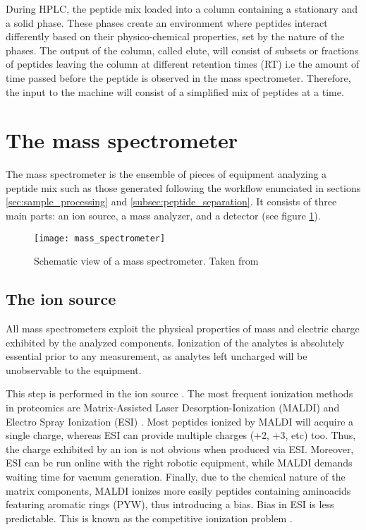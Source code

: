 During \ac{HPLC}, the peptide mix loaded into a column containing a stationary and a solid phase. These phases create an environment where peptides interact differently based on their physico-chemical properties, set by the nature of the phases. The output of the column, called elute, will consist of subsets or fractions of peptides leaving the column at different retention times (\ac{RT}) i.e the amount of time passed before the peptide is observed in the mass spectrometer. Therefore, the input to the machine will consist of a simplified mix of peptides at a time.

\section{The mass spectrometer}
\label{sec:the_mass_spectrometer}

The mass spectrometer is the ensemble of pieces of equipment analyzing a peptide mix such as those generated following the workflow enunciated in sections \ref{sec:sample_processing} and \ref{subsec:peptide_separation}. It consists of three main parts: an ion source, a mass analyzer, and a detector (see figure \ref{fig:mass_spectrometer}).

\begin{figure}[!h]
\texttt{[image: mass\_spectrometer]}
\caption[]{Schematic view of a mass spectrometer. Taken from \footnotemark{}}
\label{fig:mass_spectrometer}
\end{figure}


\subsection{The ion source}
\label{subsec:the_ion_source}

All mass spectrometers exploit the physical properties of mass and electric charge exhibited by the analyzed components. Ionization of the analytes is absolutely essential prior to any measurement, as analytes left uncharged will be unobservable to the equipment.


This step is performed in the ion source \cite{Barsnes2008}. The most frequent ionization methods in proteomics are Matrix-Assisted Laser Desorption-Ionization (\ac{MALDI}) and Electro Spray Ionization (\ac{ESI}) \cite{Mirzaei2016}. Most peptides ionized by MALDI will acquire a single charge, whereas ESI can provide multiple charges (+2, +3, etc) too. Thus, the charge exhibited by an ion is not obvious when produced via ESI. Moreover, ESI can be run online with the right robotic equipment, while MALDI demands waiting time for vacuum generation. Finally, due to the chemical nature of the matrix components, MALDI ionizes more easily peptides containing aminoacids featuring aromatic rings (PYW), thus introducing a bias. Bias in ESI is less predictable. This is known as the competitive ionization problem \cite{Tang2004}.

